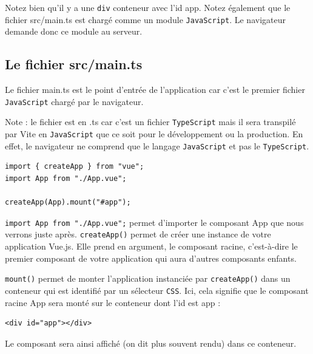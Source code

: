 Notez bien qu'il y a une {\tt div} conteneur avec l'{\color{monOrange}id app}. Notez également que le fichier src/main.ts est chargé comme un module {\tt JavaScript}. Le navigateur demande donc ce module au serveur.

\subsection{Le fichier {\color{monOrange}src/main.ts}}
Le fichier {\color{monOrange}main.ts} est le point d'entrée de l'application car c'est le premier fichier {\tt JavaScript} chargé par le navigateur.

Note : le fichier est en {\color{monOrange}.ts} car c'est un fichier {\tt TypeScript} mais il sera transpilé par Vite en {\tt JavaScript} que ce soit pour le développement ou la production. En effet, le navigateur ne comprend que le langage {\tt JavaScript} et pas le {\tt TypeScript}.
\begin{verbatim}
import { createApp } from "vue";
import App from "./App.vue";

createApp(App).mount("#app");
\end{verbatim} 

{\tt import App from "./App.vue";} permet d'importer le composant {\color{monOrange}App} que nous verrons juste après. {\tt createApp()} permet de créer une instance de votre application {\color{monOrange}Vue.js}. Elle prend en argument, le composant racine, c'est-à-dire le premier composant de votre application qui aura d'autres composants enfants.

{\tt mount()} permet de monter l'application instanciée par {\tt createApp()} dans un conteneur qui est identifié par un sélecteur {\tt CSS}. Ici, cela signifie que le composant racine {\color{monOrange}App} sera monté sur le conteneur dont l'{\color{monOrange}id} est {\color{monOrange}app} :
\begin{verbatim}
<div id="app"></div>
\end{verbatim} 

Le composant sera ainsi affiché (on dit plus souvent rendu) dans ce conteneur.


